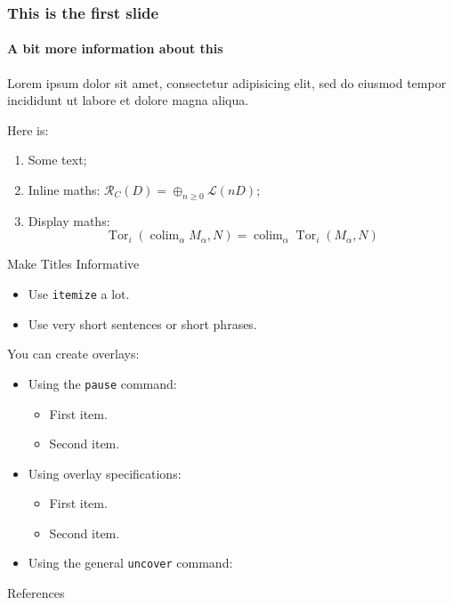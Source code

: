 \documentclass[smaller, aspectratio=169]{beamer}
\title[Paper Presentation]{\paperTitle}
\author{Alireza Heidari}
\institute{Simon Fraser University}
\date[December 2024]{\paperConference, \paperPublishedYear}
\begin{document}
\begin{frame}[plain]
    \titlepage
\end{frame}

\begin{frame}
  \frametitle{This is the first slide}
  \framesubtitle{A bit more information about this}
  
  Lorem ipsum dolor sit amet, consectetur adipisicing elit, sed do eiusmod tempor incididunt ut labore et dolore magna aliqua.
  
  Here is:
  \begin{enumerate}
      \item Some text;
      \item Inline maths: $\mathcal{R}_C(D)=\oplus_{n\geqslant0}\mathcal{L}(nD)$;
      \item Display maths:
      \[
          \operatorname{Tor}_i(\operatorname{colim}_\alpha M_\alpha, N) = \operatorname{colim}_\alpha\operatorname{Tor}_i(M_\alpha, N)
      \]
  \end{enumerate}
\end{frame}


\begin{frame}{Make Titles Informative}
  \begin{itemize}
      \item Use \texttt{itemize} a lot.
      \item Use very short sentences or short phrases.
  \end{itemize}
  You can create overlays:
  \begin{itemize}
      \item Using the \texttt{pause} command:
      \begin{itemize}
          \item First item.
          \pause
          \item Second item.
      \end{itemize}
      \item Using overlay specifications:
      \begin{itemize}
          \item<3-> First item.
          \item<4-> Second item.
      \end{itemize}
      \item Using the general \texttt{uncover} command:
      \begin{itemize}
      \end{itemize}
  \end{itemize}
\end{frame}


\begin{frame}[t]{References}
    \nocite{*}
    \printbibliography
\end{frame}
\end{document}
